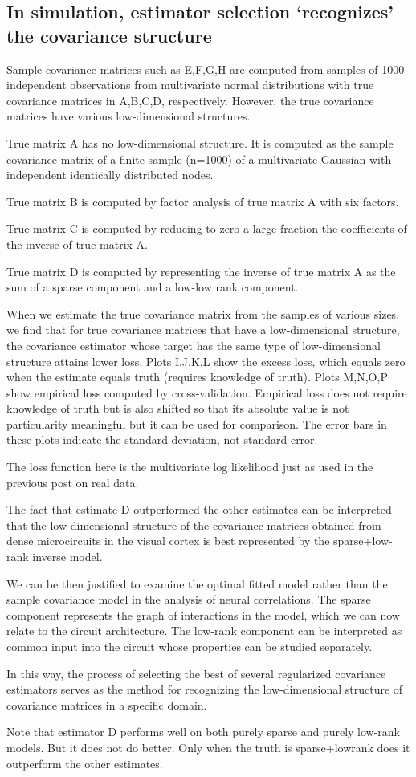 \subsection*{In simulation, estimator selection `recognizes' the covariance structure}


Sample covariance matrices such as E,F,G,H are computed from samples of 1000 independent observations from multivariate normal distributions with true covariance matrices in A,B,C,D, respectively.  However, the true covariance matrices have various low-dimensional structures. 

True matrix A has no low-dimensional structure.  It is computed as the sample covariance matrix of a finite sample (n=1000) of a multivariate Gaussian with independent identically distributed nodes.  

True matrix B is computed by factor analysis of true matrix A with six factors.  

True matrix C is computed by reducing to zero a large fraction the coefficients of the inverse of true matrix A. 

True matrix D is computed by representing the inverse of true matrix A as the sum of a sparse component and a low-low rank component. 

When we estimate the true covariance matrix from the samples of various sizes, we find that for true covariance matrices that have a low-dimensional structure, the covariance estimator whose target has the same type of low-dimensional structure attains lower loss. Plots I,J,K,L show the excess loss, which equals zero when the estimate equals truth (requires knowledge of truth). Plots M,N,O,P show empirical loss computed by cross-validation.  Empirical loss does not require knowledge of truth but is also shifted so that its absolute value is not particularity meaningful but it can be used for comparison. The error bars in these plots indicate the standard deviation, not standard error.

The loss function here is the multivariate log likelihood just as used in the previous post on real data. 

The fact that estimate D outperformed the other estimates can be interpreted that the low-dimensional structure of the covariance matrices obtained from dense microcircuits in the visual cortex is best represented by the sparse+low-rank inverse model. 

We can be then justified to examine the optimal fitted model rather than the sample covariance model in the analysis of neural correlations.  The sparse component represents the graph of interactions in the model, which we can now relate to the circuit architecture.  The low-rank component can be interpreted as common input into the circuit whose properties can be studied separately.

In this way, the process of selecting the best of several regularized covariance estimators serves as the method for recognizing the low-dimensional structure of covariance matrices in a specific domain. 

Note that estimator D performs well on both purely sparse and purely low-rank models. But it does not do better.  Only when the truth is sparse+lowrank does it outperform the other estimates.
